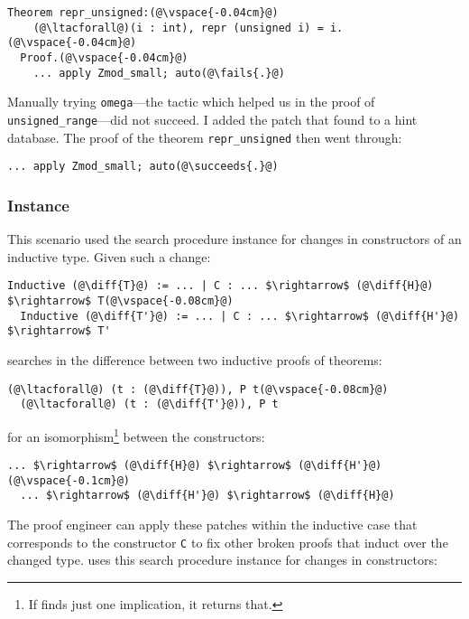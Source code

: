 \begin{lstlisting}[language=coq]
  Theorem repr_unsigned:(@\vspace{-0.04cm}@)
    (@\ltacforall@)(i : int), repr (unsigned i) = i.(@\vspace{-0.04cm}@)
  Proof.(@\vspace{-0.04cm}@)
    ... apply Zmod_small; auto(@\fails{.}@)
\end{lstlisting}
Manually trying \lstinline{omega}---the tactic which helped us in the proof of \lstinline{unsigned_range}---did not
succeed.
I added the patch that \sysname found to a hint database.
The proof of the theorem \lstinline{repr_unsigned} then went through:

\begin{lstlisting}[language=coq]
  ... apply Zmod_small; auto(@\succeeds{.}@)
\end{lstlisting}

\subsubsection{Instance}

This scenario used the search procedure instance for changes in constructors of an inductive type.
Given such a change:

\begin{lstlisting}[language=coq]
  Inductive (@\diff{T}@) := ... | C : ... $\rightarrow$ (@\diff{H}@) $\rightarrow$ T(@\vspace{-0.08cm}@)
  Inductive (@\diff{T'}@) := ... | C : ... $\rightarrow$ (@\diff{H'}@) $\rightarrow$ T'
\end{lstlisting}
\sysname searches in the difference between two inductive proofs of theorems:

\begin{lstlisting}[language=coq]
  (@\ltacforall@) (t : (@\diff{T}@)), P t(@\vspace{-0.08cm}@)
  (@\ltacforall@) (t : (@\diff{T'}@)), P t
\end{lstlisting}
for an isomorphism\footnote{If \sysname finds just one implication, it returns that.} between the constructors:

\begin{lstlisting}[language=coq]
  ... $\rightarrow$ (@\diff{H}@) $\rightarrow$ (@\diff{H'}@)(@\vspace{-0.1cm}@)
  ... $\rightarrow$ (@\diff{H'}@) $\rightarrow$ (@\diff{H}@)
\end{lstlisting}
The proof engineer can apply these patches within the inductive case that corresponds to the constructor \lstinline{C}
to fix other broken proofs that induct over the changed type. 
\sysname uses this search procedure instance for changes in constructors:

